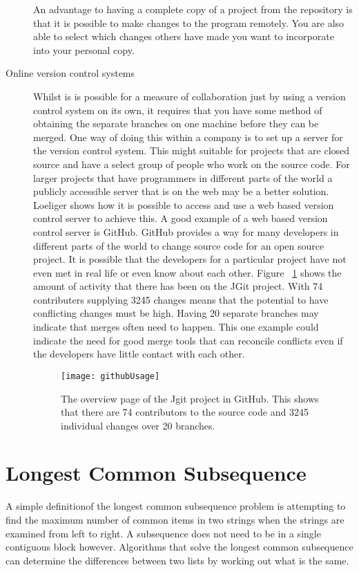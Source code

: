 \begin{description}
  An advantage to having a complete copy of a project from the repository is that it is possible to make changes to the program remotely.  You are also able to select which changes others have made you want to incorporate into your personal copy. 
  \item [Online version control systems]  
  Whilst is is possible for a measure of collaboration just by using a version control system on its own, it requires that you have some method of obtaining the separate branches on one machine before they can be merged.  One way of doing this within a company is to set up a server for the version control system.  This might suitable for projects that are closed source and have a select group of people who work on the source code.  For larger projects that have programmers in different parts of the world a publicly accessible server that is on the web may be a better solution. Loeliger \cite{Loeliger2006} shows how it is possible to access and use a web based version control server to achieve this. A good example of a web based version control server is GitHub.  GitHub provides a way for many developers in different parts of the world to change source code for an open source project.  It is possible that the developers for a particular project have not even met in real life or even know about each other. Figure ~\ref{fig:bgUsage} shows the amount of activity that there has been on the JGit project.  With 74 contributers supplying 3245 changes means that the potential to have conflicting changes must be high. Having 20 separate branches may indicate that merges often need to happen. This one example could indicate the need for good merge tools that can reconcile conflicts even if the developers have little contact with each other.

  \begin{figure}[!t]
   \begin{center}
    \texttt{[image: githubUsage]}
   \end{center}
   \caption{The overview page of the Jgit project in GitHub. This shows that there are 74 contributors to the source code and 3245 individual changes over 20 branches.}
   \label{fig:bgUsage}
  \end{figure}


  
\end{description}

\section{Longest Common Subsequence}
A simple definitionof the longest common subsequence problem is attempting to find the maximum number of common items in two strings when the strings are examined from left to right. A subsequence does not need to be in a single contiguous block however. Algorithms that solve the longest common subsequence can determine the differences between two lists by working out what is the same.   


